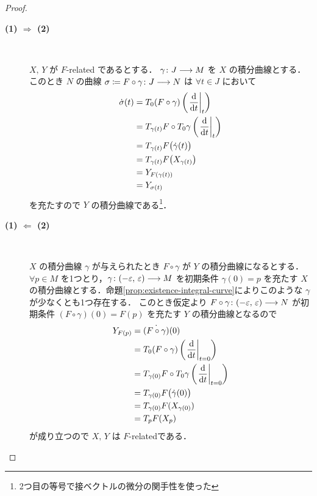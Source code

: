 \documentclass[TQFT_main]{subfiles}
\begin{document}
\begin{proof}
    \begin{description}
        \item[\textbf{(1) $\bm{\Longrightarrow}$ (2)}]　
        
        $X,\, Y$ が $F$-related であるとする．
        $\gamma \colon J \longrightarrow M$ を $X$ の積分曲線とする．このとき $N$ の\cinfty 曲線 $\sigma \coloneqq F \circ \gamma\colon J \longrightarrow N$ は $\forall t \in J$ において
        \begin{align}
            \dot{\sigma} (t) &= T_0 (F \circ \gamma) \left( \eval{\dv{}{t}}_{t} \right) \\
            &= T_{\gamma(t)} F \circ T_0 \gamma \left( \eval{\dv{}{t}}_{t} \right) \\
            &= T_{\gamma(t)} F \bigl( \dot{\gamma} (t) \bigr) \\
            &= T_{\gamma(t)} F \bigl( X_{\gamma(t)} \bigr) \\
            &= Y_{F (\gamma(t))} \\
            &= Y_{\sigma(t)}
        \end{align}
        を充たすので $Y$ の積分曲線である\footnote{2つ目の等号で接ベクトルの微分の関手性を使った}．

        \item[\textbf{(1) $\bm{\Longleftarrow}$ (2)}] 　
        
        $X$ の積分曲線 $\gamma$ が与えられたとき $F \circ \gamma$ が $Y$ の積分曲線になるとする．
        $\forall p \in M$ を1つとり，$\gamma \colon (-\varepsilon,\, \varepsilon) \longrightarrow M$ を初期条件 $\gamma(0) = p$ を充たす $X$ の積分曲線とする．命題\ref{prop:existence-integral-curve}によりこのような $\gamma$ が少なくとも1つ存在する．
        このとき仮定より $F \circ \gamma \colon (-\varepsilon,\, \varepsilon) \longrightarrow N$ が初期条件 $(F\circ \gamma)(0) = F(p)$ を充たす $Y$ の積分曲線となるので
        \begin{align}
            Y_{F(p)} &= \dot{(F \circ \gamma)} (0) \\
            &= T_{0} (F \circ \gamma) \left( \eval{\dv{}{t}}_{t=0} \right) \\
            &= T_{\gamma(0)} F \circ T_0 \gamma \left( \eval{\dv{}{t}}_{t=0} \right) \\
            &= T_{\gamma(0)} F \bigl( \dot{\gamma}(0) \bigr) \\
            &= T_{\gamma(0)} F (X_{\gamma(0)}) \\
            &= T_{p} F (X_p)
        \end{align}
        が成り立つので $X,\, Y$ は $F$-relatedである．
    \end{description}
    
\end{proof}
\end{document}
